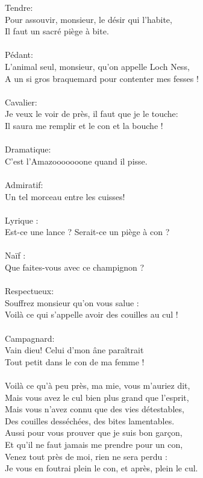 \breakpage
Tendre:
\\Pour assouvir, monsieur, le désir qui l'habite,
\\Il faut un sacré piège à bite.
\\\\Pédant:
\\L'animal seul, monsieur, qu'on appelle Loch Ness,
\\A un si gros braquemard pour contenter mes fesses !
\\\\Cavalier:
\\Je veux le voir de près, il faut que je le touche:
\\Il saura me remplir et le con et la bouche !
\\\\Dramatique: 
\\C'est l'Amazooooooone quand il pisse.
\\\\Admiratif: 
\\Un tel morceau entre les cuisses!
\\\\Lyrique : 
\\Est-ce une lance ? Serait-ce un piège à con ?
\\\\Naïf : 
\\Que faites-vous avec ce champignon ?
\\\\Respectueux:
\\Souffrez monsieur qu'on vous salue :
\\Voilà ce qui s'appelle avoir des couilles au cul !
\\\\Campagnard:
\\Vain dieu! Celui d'mon âne paraîtrait
\\Tout petit dans le con de ma femme !
\\\\Voilà ce qu'à peu près, ma mie, vous m'auriez dit, 
\\Mais vous avez le cul bien plus grand que l'esprit, 
\\Mais vous n'avez connu que des vies détestables, 
\\Des couilles desséchées, des bites lamentables. 
\\Aussi pour vous prouver que je suis bon garçon, 
\\Et qu'il ne faut jamais me prendre pour un con, 
\\Venez tout près de moi, rien ne sera perdu : 
\\Je vous en foutrai plein le con, et après, plein le cul.

\breakpage